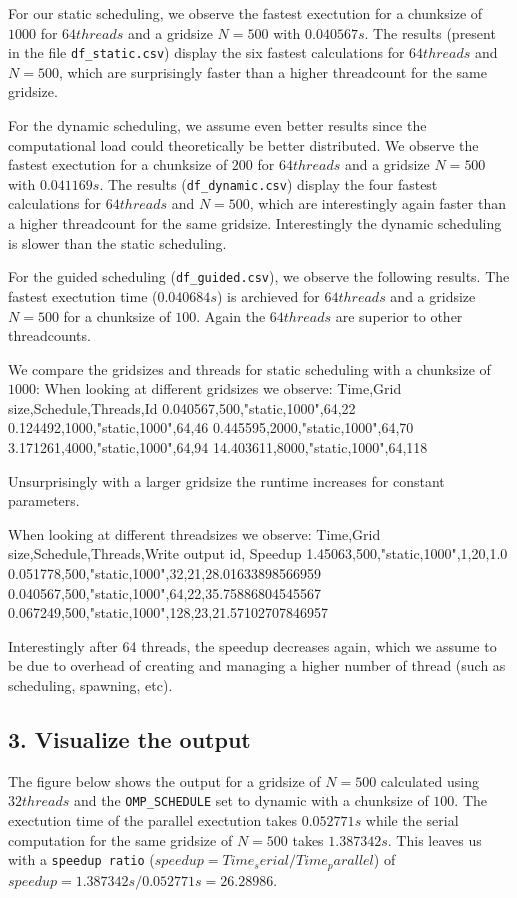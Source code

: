 \documentclass[a4paper,10pt]{article}
\begin{document}
For our static scheduling, we observe the fastest exectution for a chunksize of $ 1000 $ for $64 threads$ and a gridsize $N=500$ with $0.040567 s$.
The results (present in the file \verb|df_static.csv|) display the six fastest calculations for $64 threads$ and $N=500$, which are surprisingly faster than a higher threadcount for the same gridsize.

For the dynamic scheduling, we assume even better results since the computational load could theoretically be better distributed. 
We observe the fastest exectution for a chunksize of $ 200 $ for $64 threads$ and a gridsize $N=500$ with $0.041169 s$.
The results (\verb|df_dynamic.csv|) display the four fastest calculations for $64 threads$ and $N=500$, which are interestingly again faster than a higher threadcount for the same gridsize.
Interestingly the dynamic scheduling is slower than the static scheduling.

For the guided scheduling (\verb|df_guided.csv|), we observe the following results. The fastest exectution time ($0.040684 s$) is archieved for $64 threads$ and a gridsize $N=500$ for a chunksize of $100$.
Again the $64 threads$ are superior to other threadcounts.

We compare the gridsizes and threads for static scheduling with a chunksize of $1000$:
When looking at different gridsizes we observe:
Time,Grid size,Schedule,Threads,Id
0.040567,500,"static,1000",64,22
0.124492,1000,"static,1000",64,46
0.445595,2000,"static,1000",64,70
3.171261,4000,"static,1000",64,94
14.403611,8000,"static,1000",64,118

Unsurprisingly with a larger gridsize the runtime increases for constant parameters.

When looking at different threadsizes we observe:
Time,Grid size,Schedule,Threads,Write output id, Speedup
1.45063,500,"static,1000",1,20,1.0
0.051778,500,"static,1000",32,21,28.01633898566959
0.040567,500,"static,1000",64,22,35.75886804545567
0.067249,500,"static,1000",128,23,21.57102707846957

Interestingly after 64 threads, the speedup decreases again, which we assume to be due to overhead of creating and managing a higher number of thread (such as scheduling, spawning, etc).

\subsection{3. Visualize the output}
The figure below shows the output for a gridsize of $N=500$ calculated using $32 threads$ and the \verb|OMP_SCHEDULE| set to dynamic with a 
chunksize of $ 100 $.
The exectution time of the parallel exectution takes $0.052771s$ while the serial computation for the same gridsize of $N=500$ takes $1.387342s$.  
This leaves us with a \verb|speedup ratio| ($speedup = Time_serial / Time_parallel$) of $speedup = 1.387342s/0.052771s = 26.28986 $. 
\end{document}
